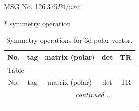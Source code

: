 \documentclass[fleqn,8pt]{jsarticle}
\begin{document}
\setcounter{MaxMatrixCols}{32}

\renewcommand{\tablename}{Table~}
\renewcommand{\figurename}{Figure~}
\begin{center}
\LARGE
MSG No. 126.375\quad$P4/nnc$
\end{center}
* symmetry operation
\renewcommand{\arraystretch}{1.3}
\begin{longtable}{ccccc}
\caption{Symmetry operations for 3d polar vector.}
 \\
 \hline \hline
No. & tag & matrix (polar) & det & TR \\ \hline \endfirsthead

\multicolumn{4}{l}{\tablename\ \thetable{}} \\
 \hline \hline
No. & tag & matrix (polar) & det & TR \\ \hline \endhead

 \hline \hline
\multicolumn{4}{r}{\footnotesize\it continued ...} \\ \endfoot

 \hline \hline
\multicolumn{4}{r}{} \\ \endlastfoot


\end{longtable}
\end{document}
